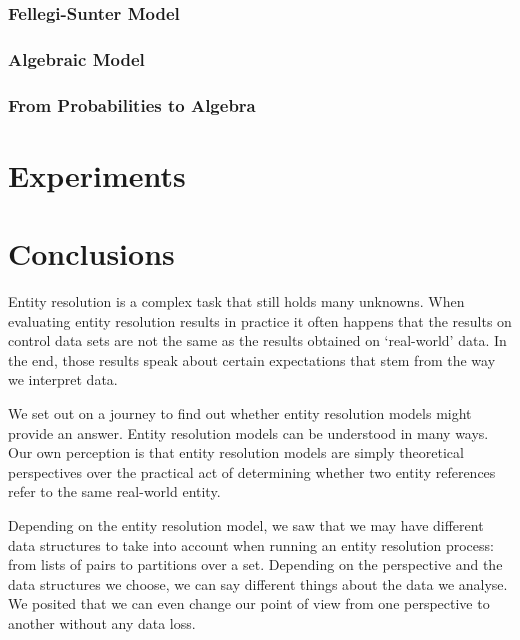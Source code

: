 \documentclass[journal]{IEEEtran}
\begin{document}
    \subsubsection[fsm]{Fellegi-Sunter Model}\label{subsec:fsm}
    

    \subsubsection[algebraic]{Algebraic Model}\label{subsec:algebraic}
    

    \subsubsection{From Probabilities to Algebra}\label{subsec:fsm-alg}
    
        
    \section{Experiments}\label{sec:experiments}
    

    \section[conclusion]{Conclusions}\label{sec:conclusions}

    Entity resolution is a complex task that still holds many unknowns.
    When evaluating entity resolution results in practice it often happens that
    the results on control data sets are not the same as the results obtained
    on `real-world' data.
    In the end, those results speak about certain expectations that stem from
    the way we interpret data.

    We set out on a journey to find out whether entity resolution models might
    provide an answer.
    Entity resolution models can be understood in many ways.
    Our own perception is that entity resolution models are simply theoretical
    perspectives over the practical act of determining whether two entity
    references refer to the same real-world entity.

    Depending on the entity resolution model, we saw that we may have different
    data structures to take into account when running an entity resolution
    process: from lists of pairs to partitions over a set.
    Depending on the perspective and the data structures we choose, we can say
    different things about the data we analyse.
    We posited that we can even change our point of view from one perspective to
    another without any data loss.
\end{document}

